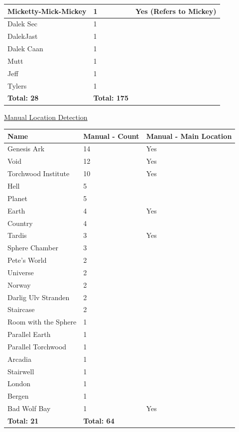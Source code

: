 \begin{center}
\begin{longtable}{|p{160pt}|p{90pt}|p{140pt}|}
Micketty-Mick-Mickey			&1				& Yes (Refers to Mickey)		\\\hline
Dalek Sec						&1				&						\\\hline		          
DalekJast						&1				&						\\\hline		          
Dalek Caan					&1				&						\\\hline		          
Mutt							&1				&						\\\hline		          
Jeff							&1				&						\\\hline		          
Tylers						&1				&						\\\hline		          
\textbf{Total: 28}				&\textbf{Total: 175}	&						\\\hline		          
\end{longtable}
\end{center}

\newpage
\underline{Manual Location Detection}

\begin{center}
\begin{tabular}{|p{160pt}|p{90pt}|p{140pt}|}
\hline
\textbf{Name}				&\textbf{Manual - Count}		&\textbf{Manual - Main Location}		\\\hline
Genesis Ark			&14					&Yes						\\\hline	
Void					&12					&Yes						\\\hline
Torchwood Institute		&10					&Yes						\\\hline
Hell					&5					&						\\\hline
Planet				&5					&						\\\hline
Earth				&4					&Yes						\\\hline
Country				&4					&						\\\hline
Tardis				&3					&Yes						\\\hline
Sphere Chamber		&3					&						\\\hline
Pete’s World			&2					&						\\\hline
Universe				&2					&						\\\hline
Norway				&2					&						\\\hline
Darlig Ulv Stranden		&2					&						\\\hline		
Staircase				&2					&						\\\hline
Room with the Sphere	&1					&						\\\hline
Parallel Earth			&1					&						\\\hline	
Parallel Torchwood		&1					&						\\\hline
Arcadia				&1					&						\\\hline
Stairwell				&1					&						\\\hline
London				&1					&						\\\hline
Bergen				&1					&						\\\hline
Bad Wolf Bay			&1					&Yes						\\\hline
\textbf{Total: 21}		&\textbf{Total: 64}		&						\\\hline
\end{tabular}
\end{center}

